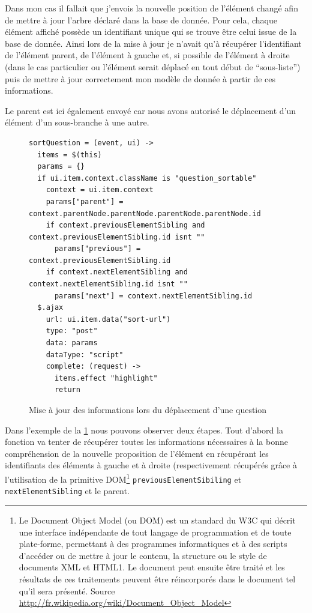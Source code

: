 \documentclass[12pt,a4paper]{book}
\begin{document}
Dans mon cas il fallait que j'envois la nouvelle position de l'élément changé afin de mettre à jour l'arbre déclaré dans la base de donnée. Pour cela, chaque élément affiché possède un identifiant unique qui se trouve être celui issue de la base de donnée. Ainsi lors de la mise à jour je n'avait qu'à récupérer l'identifiant de l'élément parent, de l'élément à gauche et, si possible de l'élément à droite (dans le cas particulier ou l'élément serait déplacé en tout début de ``sous-liste'') puis de mettre à jour correctement mon modèle de donnée à partir de ces informations.

Le parent est ici également envoyé car nous avons autorisé le déplacement d'un élément d'un sous-branche à une autre.

\begin{figure}[h]
\begin{lstlisting}
sortQuestion = (event, ui) ->
  items = $(this)
  params = {}
  if ui.item.context.className is "question_sortable"
    context = ui.item.context
    params["parent"] = context.parentNode.parentNode.parentNode.parentNode.id
    if context.previousElementSibling and context.previousElementSibling.id isnt ""
      params["previous"] = context.previousElementSibling.id
    if context.nextElementSibling and context.nextElementSibling.id isnt ""
      params["next"] = context.nextElementSibling.id 
  $.ajax
    url: ui.item.data("sort-url")
    type: "post"
    data: params
    dataType: "script"
    complete: (request) ->
      items.effect "highlight"
      return
\end{lstlisting}
 \caption{Mise à jour des informations lors du déplacement d'une question}
 \label{fig.sort2}
\end{figure}

Dans l'exemple de la \cref{fig.sort2} nous pouvons observer deux étapes. Tout d'abord la fonction va tenter de récupérer toutes les informations nécessaires à la bonne compréhension de la nouvelle proposition de l'élément en récupérant les identifiants des éléments à gauche et à droite (respectivement récupérés grâce à l'utilisation de la primitive DOM\footnote{Le Document Object Model (ou DOM) est un standard du W3C qui décrit une interface indépendante de tout langage de programmation et de toute plate-forme, permettant à des programmes informatiques et à des scripts d'accéder ou de mettre à jour le contenu, la structure ou le style de documents XML et HTML1. Le document peut ensuite être traité et les résultats de ces traitements peuvent être réincorporés dans le document tel qu'il sera présenté. Source \url{http://fr.wikipedia.org/wiki/Document_Object_Model}} \texttt{previousElementSibiling} et \texttt{nextElementSibling} et le parent.
\end{document}
